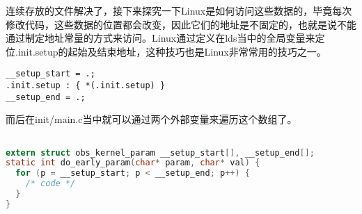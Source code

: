 连续存放的文件解决了，接下来探究一下Linux是如何访问这些数据的，毕竟每次修改代码，这些数据的位置都会改变，因此它们的地址是不固定的，也就是说不能通过制定地址常量的方式来访问。Linux通过定义在lds当中的全局变量来定位.init.setup的起始及结束地址，这种技巧也是Linux非常常用的技巧之一。
\begin{lstlisting}
__setup_start = .;
.init.setup : { *(.init.setup) }
__setup_end = .;
\end{lstlisting}

而后在init/main.c当中就可以通过两个外部变量来遍历这个数组了。
\begin{lstlisting}[language=c]

extern struct obs_kernel_param __setup_start[], __setup_end[];
static int do_early_param(char* param, char* val) {
  for (p = __setup_start; p < __setup_end; p++) {
    /* code */
  }
}
\end{lstlisting}
